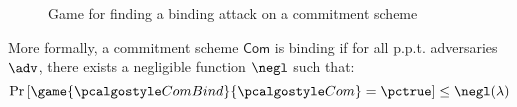 \begin{figure}[tbhp]
  \begin{center}
    \begin{tcolorbox}[width=8cm]
      \begin{pchstack}[center]
      \end{pchstack}
    \end{tcolorbox}
  \end{center}
  \caption{Game for finding a binding attack on a commitment scheme \label{fig:break-com-bind}}
\end{figure}


More formally, a commitment scheme $\mathsf{Com}$ is binding if for all p.p.t. adversaries $\adv$, there exists a negligible function $\negl$ such that:
\[ \pr{\game{\algo{ComBind}}{\algo{Com}} = \pctrue} \leq \negl(\lambda) \]







